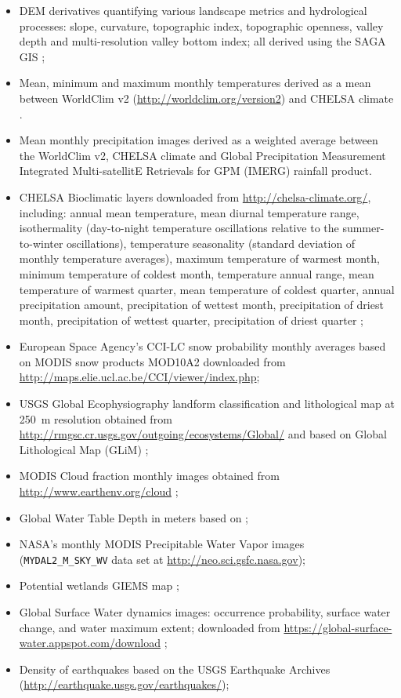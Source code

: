 \documentclass[fleqn,10pt,lineno]{wlpeerj} %
\begin{document}
\begin{itemize}[noitemsep]
  \item DEM derivatives quantifying various landscape metrics and hydrological processes: slope, curvature, topographic index, topographic openness, valley depth and multi-resolution valley bottom index; all derived using the SAGA GIS \citep{gmd-8-1991-2015};
  \item Mean, minimum and maximum monthly temperatures derived as a mean between WorldClim v2 (\url{http://worldclim.org/version2}) and CHELSA climate \citep{karger2017climatologies}.
  \item Mean monthly precipitation images derived as a weighted average between the WorldClim v2, CHELSA climate and Global Precipitation Measurement Integrated Multi-satellitE Retrievals for GPM (IMERG) rainfall product.
  \item CHELSA Bioclimatic layers downloaded from \url{http://chelsa-climate.org/}, including: annual mean temperature, mean diurnal temperature range, isothermality (day-to-night temperature oscillations relative to the summer-to-winter oscillations), temperature seasonality (standard deviation of monthly temperature averages), maximum temperature of warmest month, minimum temperature of coldest month, temperature annual range, mean temperature of warmest quarter, mean temperature of coldest quarter, annual precipitation amount, precipitation of wettest month, precipitation of driest month, precipitation of wettest quarter, precipitation of driest quarter \citep{karger2017climatologies};
  \item European Space Agency's CCI-LC snow probability monthly averages based on MODIS snow products MOD10A2 downloaded from \url{http://maps.elie.ucl.ac.be/CCI/viewer/index.php};
  \item USGS Global Ecophysiography landform classification and lithological map at \SI{250}{\metre} resolution  obtained from \url{http://rmgsc.cr.usgs.gov/outgoing/ecosystems/Global/} and based on Global Lithological Map (GLiM) \citep{GGGE:GGGE2352};
  \item MODIS Cloud fraction monthly images obtained from \url{http://www.earthenv.org/cloud} \citep{WilsonJetz2016};
  \item Global Water Table Depth in meters based on \citet{fan2013global};
  \item NASA's monthly MODIS Precipitable Water Vapor images (\verb"MYDAL2_M_SKY_WV" data set at \url{http://neo.sci.gsfc.nasa.gov});
  \item Potential wetlands GIEMS map \citep{fluet2015development};
  \item Global Surface Water dynamics images: occurrence probability, surface water change, and water maximum extent; downloaded from \url{https://global-surface-water.appspot.com/download} \citep{pekel2016high};
  \item Density of earthquakes based on the USGS Earthquake Archives (\url{http://earthquake.usgs.gov/earthquakes/});
\end{itemize}
\end{document}
